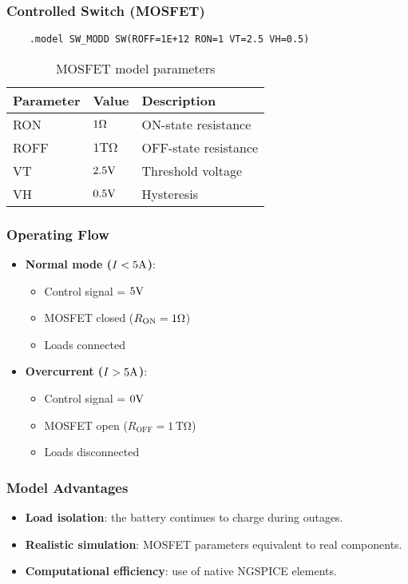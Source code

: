 \subsubsection*{Controlled Switch (MOSFET)}
\begin{verbatim}
    .model SW_MODD SW(ROFF=1E+12 RON=1 VT=2.5 VH=0.5)
\end{verbatim}

\begin{table}[H]
\centering
\begin{tabular}{lll}
\hline
Parameter & Value & Description \\
\hline
RON & $1\ohm$ & ON-state resistance \\
ROFF & $1\si{\tera\ohm}$ & OFF-state resistance \\
VT & $2.5\volt$ & Threshold voltage \\
VH & $0.5\volt$ & Hysteresis \\
\hline
\end{tabular}
\caption{MOSFET model parameters}
\end{table}

\subsubsection*{Operating Flow}
\begin{itemize}
\item \textbf{Normal mode ($I < 5\ampere$)}:
  \begin{itemize}
  \item Control signal = $5\volt$
  \item MOSFET closed ($R_{\text{ON}} = 1\ohm$)
  \item Loads connected
  \end{itemize}

\item \textbf{Overcurrent ($I > 5\ampere$)}:
  \begin{itemize}
  \item Control signal = $0\volt$
  \item MOSFET open ($R_{\text{OFF}} = 1\,\si{\tera\ohm}$)
  \item Loads disconnected
  \end{itemize}
\end{itemize}

\subsubsection*{Model Advantages}
\begin{itemize}
\item \textbf{Load isolation}: the battery continues to charge during outages.
\item \textbf{Realistic simulation}: MOSFET parameters equivalent to real components.
\item \textbf{Computational efficiency}: use of native NGSPICE elements.
\end{itemize}